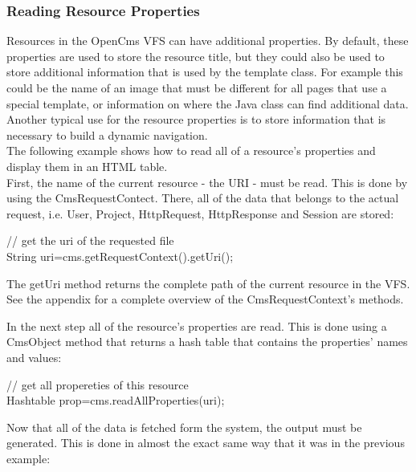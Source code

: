 \subsubsection{Reading Resource Properties}
Resources in the OpenCms VFS can have additional properties. By default,
these properties are used to store the resource title, but they could
also be used to store additional information that is used by the
template class. For example this could be the name of an image that
must be different for all pages that use a special template, or
information on where the Java class can find additional data. Another
typical use for the resource properties is to store information that is
necessary to build a dynamic navigation.\\

The following example shows how to read all of a resource's properties
and display them in an HTML table.\\

First, the name of the current resource - the URI - must be read. This
is done by using the {\name CmsRequestContect}. There, all of the data that
belongs to the actual request, i.e. User, Project, HttpRequest,
HttpResponse and Session are stored:\\

\begin{java}
// get the uri of the requested file\\
 String uri=cms.getRequestContext().getUri();\\
\end{java}

The getUri method returns the complete path of the current resource in
the VFS. See the appendix for a complete overview of the
{\name CmsRequestContext's} methods.

In the next step all of the {\name resource's} properties are read. This is
done using a CmsObject method that returns a hash table that contains
the {\name properties'} names and values:

\begin{java} 
// get all propereties of this resource\\
 Hashtable prop=cms.readAllProperties(uri);\\
\end{java}

Now that all of the data is fetched form the system, the output must be
generated. This is done in almost the exact same way that it was in the
previous example:

